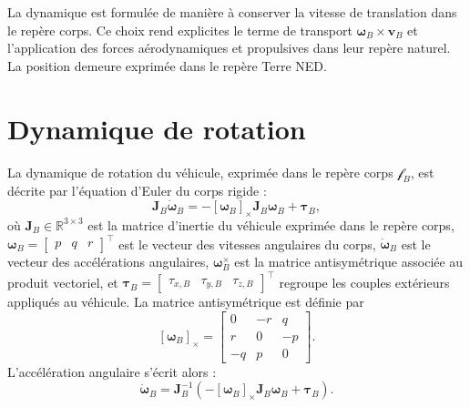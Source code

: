\documentclass[11pt,a4paper,oneside]{report}
\newcommand{\vect}[1]{\bm{#1}}
\newcommand{\crossmat}[1]{\left[#1\right]_{\times}}
\begin{document}
	
	
	La dynamique est formulée de manière à conserver la vitesse de translation dans le repère corps. Ce choix rend explicites le terme de transport $\vect\omega_B\times\vect v_B$ et l'application des forces aérodynamiques et propulsives dans leur repère naturel. La position demeure exprimée dans le repère Terre NED.
	
	
	
	\section{Dynamique de rotation}
	La dynamique de rotation du véhicule, exprimée dans le repère corps
	\(\mathcal{f}_B\), est décrite par l'équation d'Euler du corps rigide :
	\begin{equation}
		\mathbf{J}_B \dot{\boldsymbol{\omega}}_B
		= -\crossmat{\vect\omega_B}
		\mathbf{J}_B
		\boldsymbol{\omega}_B
		+
		\boldsymbol{\tau}_B,
		\label{eq_rotational_dynamics_general}
	\end{equation}
	où
	\(\mathbf{J}_B \in \mathbb{R}^{3\times3}\) est la matrice d'inertie du véhicule
	exprimée dans le repère corps,
	\(\boldsymbol{\omega}_B =
	\begin{bmatrix}
		p & q & r
	\end{bmatrix}^{\top}\)
	est le vecteur des vitesses angulaires du corps,
	\(\dot{\boldsymbol{\omega}}_B\) est le vecteur des accélérations angulaires,
	\(\boldsymbol{\omega}_B^{\times}\) est la matrice antisymétrique associée au
	produit vectoriel, et
	\(\boldsymbol{\tau}_B =
	\begin{bmatrix}
		\tau_{x,B} & \tau_{y,B} & \tau_{z,B}
	\end{bmatrix}^{\top}\)
	regroupe les couples extérieurs appliqués au véhicule.
	La matrice antisymétrique est définie par
	\begin{equation}
		\crossmat{\vect\omega_B}
		=
		\begin{bmatrix}
			0 & -r & q\\
			r & 0 & -p\\
			-q & p & 0
		\end{bmatrix}.
		\label{eq_skew_omega}
	\end{equation}
	L'accélération angulaire s'écrit alors :
	\begin{equation}
		\dot{\boldsymbol{\omega}}_B
		=
		\mathbf{J}_B^{-1}
		\left(
		-\crossmat{\vect\omega_B}
		\mathbf{J}_B
		\boldsymbol{\omega}_B
		+
		\boldsymbol{\tau}_B
		\right).
		\label{eq_angular_acceleration}
	\end{equation}
	
\end{document}
